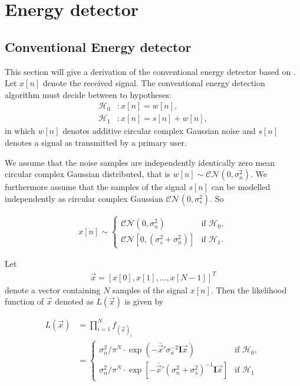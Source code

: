 \documentclass[a4paper, openany, oneside]{memoir}
\begin{document}
\section{Energy detector}

\subsection{Conventional Energy detector}\label{ssec:conv_ed_derivation}
This section will give a derivation of the conventional energy detector based on \cite{atapattu2014energy}.
Let $x[n]$ denote the received signal. The conventional energy detection algorithm must decide between to hypotheses:
\begin{align}\label{eq:hypotheses}
  \mathcal{H}_0&: x[n] = w[n],\\
  \mathcal{H}_1&: x[n] = s[n] + w[n],
\end{align}
in which $w[n]$ denotes additive circular complex Gaussian noise and $s[n]$ denotes a signal as transmitted by a primary user.

We assume that the noise samples are independently identically zero mean circular complex Gaussian distributed, that is $w[n] \sim \mathcal{CN}(0, \sigma_n^2)$. 
We furthermore assume that the samples of the signal $s[n]$ can be modelled independently as circular complex Gaussian $\mathcal{CN}(0, \sigma_s^2)$. %
So

\begin{align*}
x[n] \sim 
    \begin{cases}
        \mathcal{CN}(0, \sigma_n^2) & \text{if $\mathcal{H}_0$}, \\
        \mathcal{CN}[0, (\sigma_s^2 + \sigma_n^2)] & \text{if $\mathcal{H}_1$}.
    \end{cases}
\end{align*} 

Let
\begin{align*}
    \vec{x} = \left[x[0], x[1], \ldots, x[N-1]\right]^T
\end{align*}
denote a vector containing $N$ samples of the signal $x[n]$. Then the likelihood function of $\vec{x}$ denoted as $L(\vec{x})$ is given by

\begin{align*}
    L(\vec{x}) &= \prod_{i=1}^N f_{(\vec{x})_i}\\
    &= \begin{cases}
        \sigma_n^2/\pi^N \cdot \exp(-\bar{\vec{x}}'\sigma_n^{-2}\mathbf{I}\vec{x}) & \text{if $\mathcal{H}_0$}, \\
        \sigma_n^2/\pi^N \cdot \exp[-\bar{\vec{x}}'(\sigma_n^2+\sigma_s^2)^{-1}\mathbf{I}\vec{x}] & \text{if $\mathcal{H}_1$}
    \end{cases}
\end{align*}
\end{document}
